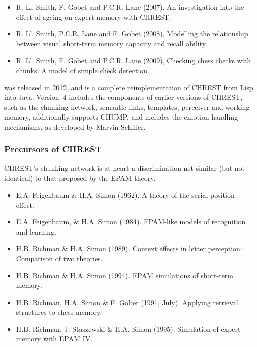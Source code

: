 \documentclass{article}
\begin{document}
\begin{itemize}
\item R. Ll. Smith, F. Gobet and P.C.R. Lane (2007), An investigation into the
effect of ageing on expert memory with CHREST.~\cite{Smith07}
\item R. Ll. Smith, P.C.R. Lane and F. Gobet (2008), Modelling the relationship
between visual short-term memory capacity and recall ability.~\cite{Smith08}
\item R. Ll. Smith, F. Gobet and P.C.R. Lane (2009), Checking chess checks with
chunks: A model of simple check detection.~\cite{Smith09}
\end{itemize}

 was released in 2012, and is a complete
reimplementation of CHREST from Lisp into Java.  Version~4 includes the
components of earlier versions of CHREST, such as the chunking network,
semantic links, templates, perceiver and working memory, additionally supports
CHUMP, and includes the emotion-handling mechanisms, as developed by Marvin
Schiller.

\subsubsection{Precursors of CHREST}

CHREST's chunking network is at heart a discrimination net similar (but not
identical) to that proposed by the EPAM theory.

\begin{itemize}
\item E.A. Feigenbaum \& H.A. Simon (1962). A theory of the serial position
effect.~\cite{Feigenbaum62}
\item E.A. Feigenbaum, \& H.A. Simon (1984). EPAM-like models of recognition 
and learning.~\cite{Feigenbaum84}
\item H.B. Richman \& H.A. Simon (1989). Context effects in letter
perception: Comparison of two theories.~\cite{Richman89}
\item H.B. Richman \& H.A. Simon (1994). EPAM simulations of short-term
memory.~\cite{Richman94} 
\item H.B. Richman, H.A. Simon \& F. Gobet (1991, July).
Applying retrieval structures to chess memory.~\cite{Richman91}
\item H.B. Richman, J. Staszewski \& H.A. Simon (1995). Simulation of expert memory with EPAM IV.~\cite{Richman95}
\end{itemize}
\end{document}
